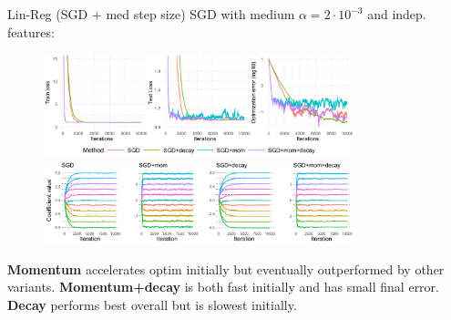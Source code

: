 \documentclass[11pt,compress,t,notes=noshow, xcolor=table]{beamer}
\begin{document}
\begin{vbframe}{Lin-Reg (SGD + med step size)}
\vspace{-0.4cm}
SGD with medium $\alpha=2\cdot10^{-3}$ and indep. features:
\begin{figure}
            \includegraphics[width=0.8\textwidth]{slides/04-multivariate-first-order/figure_man/simu_linmod/SGD_reg_med_lr_iters.pdf} \\
             \includegraphics[width=0.8\textwidth]{slides/04-multivariate-first-order/figure_man/simu_linmod/SGD_reg_coef_med.pdf}\\
            \begin{footnotesize}
            \end{footnotesize}
\end{figure}
\textbf{Momentum} accelerates optim initially but eventually outperformed by other variants. \textbf{Momentum+decay} is both fast initially and has small final error. \textbf{Decay} performs best overall but is slowest initially.
\end{vbframe}
\end{document}
